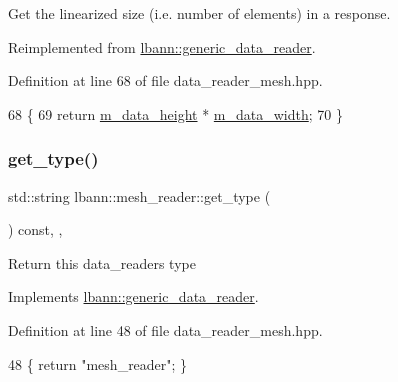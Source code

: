 Get the linearized size (i.\+e. number of elements) in a response. 



Reimplemented from \hyperlink{classlbann_1_1generic__data__reader_aacd8704cd11ed6f521cebeaac06c6cb7}{lbann\+::generic\+\_\+data\+\_\+reader}.



Definition at line 68 of file data\+\_\+reader\+\_\+mesh.\+hpp.


\begin{DoxyCode}
68                                                     \{
69     \textcolor{keywordflow}{return} \hyperlink{classlbann_1_1mesh__reader_aeb4e0df4e0be56244df5b663e2940d11}{m\_data\_height} * \hyperlink{classlbann_1_1mesh__reader_a8e16a565b0afd3097a0b6fe31a94641e}{m\_data\_width};
70   \}
\end{DoxyCode}
\mbox{\label{classlbann_1_1mesh__reader_a77e340cbb58b30b318eecb6a49ca38b6}} 
\subsubsection{\texorpdfstring{get\+\_\+type()}{get\_type()}}
{\footnotesize\ttfamily std\+::string lbann\+::mesh\+\_\+reader\+::get\+\_\+type (\begin{DoxyParamCaption}{ }\end{DoxyParamCaption}) const\hspace{0.3cm}{\ttfamily [inline]}, {\ttfamily [override]}, {\ttfamily [virtual]}}

Return this data\+\_\+reader\textquotesingle{}s type 

Implements \hyperlink{classlbann_1_1generic__data__reader_abeb849fb8e10b4fa317c90bc33f61758}{lbann\+::generic\+\_\+data\+\_\+reader}.



Definition at line 48 of file data\+\_\+reader\+\_\+mesh.\+hpp.


\begin{DoxyCode}
48 \{ \textcolor{keywordflow}{return} \textcolor{stringliteral}{"mesh\_reader"}; \}
\end{DoxyCode}
\mbox{\label{classlbann_1_1mesh__reader_a8cff71603c2d652f8b000a5dc4c75431}} 
